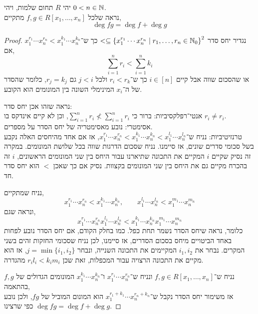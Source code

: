 \question{}
יהי $R$ תחום שלמות, ויהי $0 < n \in \mathbb{N}$. \\
נראה שלכל $f, g \in R[x_1, \ldots, x_n]$ מתקיים,
\[
	\deg fg
	= \deg f + \deg g
\]
\begin{proof}
	נגדיר יחס סדר $< \subseteq {\{ x_1^{r_1} \cdots x_n^{r_n} \mid r_1, \ldots, r_n \in \mathbb{N}_0 \}}^2$ כך ש־$x_1^{r_1} \cdots x_n^{r_n} < x_1^{k_1} \cdots x_n^{k_n}$ אם,
	\[
		\sum_{i = 1}^n r_i
		< \sum_{i = 1}^n k_i
	\]
	או שהסכום שווה אבל קיים $i \in [n]$ כך ש־$r_i < r_k$ ולכל $j < i$ גם $r_j = k_j$, כלומר שהסדר של ה־$x_i$ המינימלי השונה בין המונומים הוא הקובע.

	נראה שזהו אכן יחס סדר: \\
	אנטי־רפלקסיביות: ברור כי $\sum_{i = 1}^n r_i \not< \sum_{i = 1}^n r_i$, וכן לא קיים אינדקס בו $r_i \ne r_i$. \\
	אסימטרי: נובע מאסימטריה של יחס הסדר על מספרים. \\
	טרנזיטיביות: נניח ש־$x_1^{r_1} \cdots x_n^{r_n} < x_1^{k_1} \cdots x_n^{k_n} < x_1^{l_1} \cdots x_n^{l_n}$, אז אם אחד מהיחסים האלה נקבע בשל סכומי סדרים שונים, אז סיימנו.
	נניח שסכום הדרגות שווה בכל שלושת המונומים.
	במקרה זה נסיק שקיים $i$ המקיים את התכונה שתיארנו עבור היחס בין שני המונומים הראשונים, $i$ זה בהכרח מקיים גם את היחס בין שני המונומים בקצוות.
	נסיק אם כך שאכן $<$ הוא יחס סדר חד.

	נניח שמתקיים,
	\[
		x_1^{r_1} \cdots x_n^{r_n} < x_1^{k_1} \cdots x_n^{k_n},
		\qquad
		x_1^{l_1} \cdots x_n^{l_n} < x_1^{m_1} \cdots x_n^{m_n}
	\]
	ונראה שגם,
	\[
		x_1^{r_1} \cdots x_n^{r_n} x_1^{l_1} \cdots x_n^{l_n}
		< x_1^{k_1} \cdots x_n^{k_n} x_1^{m_1} \cdots x_n^{m_n}
	\]
	כלומר, נראה שיחס הסדר נשמר תחת כפל.
	כמו בחלק הקודם, אם יחס הסדר נובע לפחות באחד הביטויים מיחס בסכום הסדרים, אז סיימנו, לכן נניח שסכומי החזקות זהים בשני המקרים.
	נבחר את $i_1, i_2$ המקיימים את התכונה השנייה, ונבחר $j = \min\{ i_1, i_2 \}$, אז הוא מקיים את התכונה הרצויה עבור המכפלות, זאת שכן $r_i l_i < k_i m_i$ מהגדרה.

	נניח ש־$f, g \in R[x_1, \ldots, x_n]$ ונניח ש־$x_1^{r_1} \cdots x_n^{r_n}$ ו־$x_1^{k_1} \cdots x_n^{k_n}$ המונומים הגדולים של $f, g$ בהתאמה, \\
	אז משימור יחס הסדר נקבל ש־$x_1^{r_1 + k_1} \cdots x_n^{r_n + k_n}$ הוא המונום המוביל של $f g$, ולכן נובע $\deg fg = \deg f + \deg g$ כפי שרצינו.
\end{proof}

